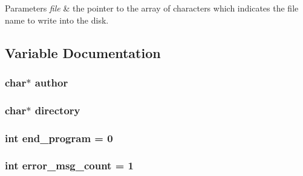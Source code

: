 \begin{DoxyParams}{Parameters}
{\em file} & the pointer to the array of characters which indicates the file name to write into the disk. \\
\hline
\end{DoxyParams}


\subsection{Variable Documentation}
\hypertarget{pacman-level-editor_8c_a70d51dcba75e5d70d4708c7885550468}{
\subsubsection[{author}]{\setlength{\rightskip}{0pt plus 5cm}char$\ast$ author}}\label{pacman-level-editor_8c_a70d51dcba75e5d70d4708c7885550468}
\hypertarget{pacman-level-editor_8c_a8eadc6730ef4fbdae87a20414b789faf}{
\subsubsection[{directory}]{\setlength{\rightskip}{0pt plus 5cm}char$\ast$ directory}}\label{pacman-level-editor_8c_a8eadc6730ef4fbdae87a20414b789faf}
\hypertarget{pacman-level-editor_8c_a1bee207ff2415ab72a1e22c86a93f100}{
\subsubsection[{end\-\_\-program}]{\setlength{\rightskip}{0pt plus 5cm}int end\-\_\-program = 0}}\label{pacman-level-editor_8c_a1bee207ff2415ab72a1e22c86a93f100}
\hypertarget{pacman-level-editor_8c_ae0ebb9a2dde9db7a8070d03799386e18}{
\subsubsection[{error\-\_\-msg\-\_\-count}]{\setlength{\rightskip}{0pt plus 5cm}int error\-\_\-msg\-\_\-count = 1}}\label{pacman-level-editor_8c_ae0ebb9a2dde9db7a8070d03799386e18}

